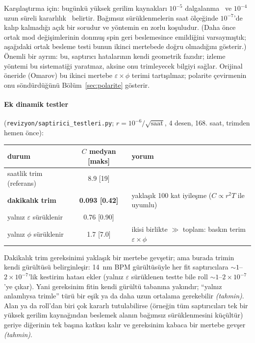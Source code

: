\documentclass[12pt,a4paper]{extarticle}
\newcommand{\tahmin}{\textit{(tahmin)}}
\begin{document}
Karşılaştırma için: bugünkü yüksek gerilim kaynakları $10^{-5}$ dalgalanma~\cite{cpedm_feas} ve $10^{-4}$ uzun
süreli kararlılık~\cite{fug} belirtir. Bağımsız sürüklenmelerin saat ölçeğinde $10^{-7}$'de kalıp kalmadığı
açık bir sorudur ve yöntemin en zorlu koşuludur. (Daha önce ortak mod değişimlerinin donmuş spin geri beslemesince
emildiğini varsaymıştık; aşağıdaki ortak besleme testi bunun ikinci mertebede doğru olmadığını gösterir.) Önemli bir ayrım: bu, saptırıcı hatalarının kendi geometrik
fazıdır; izleme yöntemi bu sistematiği yaratmaz, aksine onu trimleyecek bilgiyi sağlar. Orijinal öneride
(Omarov) bu ikinci mertebe $\varepsilon\times\phi$ terimi tartışılmaz; polarite çevirmenin onu söndürdüğünü
Bölüm~\ref{sec:polarite} gösterir.

\paragraph{Ek dinamik testler} (\texttt{revizyon/saptirici\_testleri.py}; $r=10^{-6}/\sqrt{\text{saat}}$, 4 desen,
168. saat, trimden hemen önce):
\begin{center}\footnotesize
\begin{tabular}{lcl}\toprule
durum & $C$ medyan [maks] & yorum\\\midrule
saatlik trim (referans) & 8.9 [19] & \\
\textbf{dakikalık trim} & \textbf{0.093 [0.42]} & yaklaşık 100 kat iyileşme ($C\propto r^2T$ ile uyumlu)\\
yalnız $\varepsilon$ sürüklenir & 0.76 [0.90] & \\
yalnız $\phi$ sürüklenir & 1.7 [7.0] & ikisi birlikte $\gg$ toplam: baskın terim $\varepsilon\times\phi$\\\bottomrule
\end{tabular}\end{center}
Dakikalık trim gereksinimi yaklaşık bir mertebe gevşetir; ama burada trimin kendi gürültüsü belirginleşir:
14~nm BPM gürültüsüyle her fit saptırıcılara $\sim1$--$2\times10^{-7}$'lik kestirim hatası ekler (yalnız
$\varepsilon$ sürüklenen testte bile roll $\sim1$--$2\times10^{-7}$'ye çıkar). Yani gereksinim fitin kendi
gürültü tabanına yakındır; ``yalnız anlamlıysa trimle'' türü bir eşik ya da daha uzun ortalama gerekebilir
\tahmin. Alan ya da roll'dan biri çok kararlı tutulabilirse (örneğin tüm saptırıcıları tek bir yüksek gerilim
kaynağından beslemek alanın bağımsız sürüklenmesini küçültür) geriye diğerinin tek başına katkısı kalır ve
gereksinim kabaca bir mertebe gevşer \tahmin.
\end{document}
